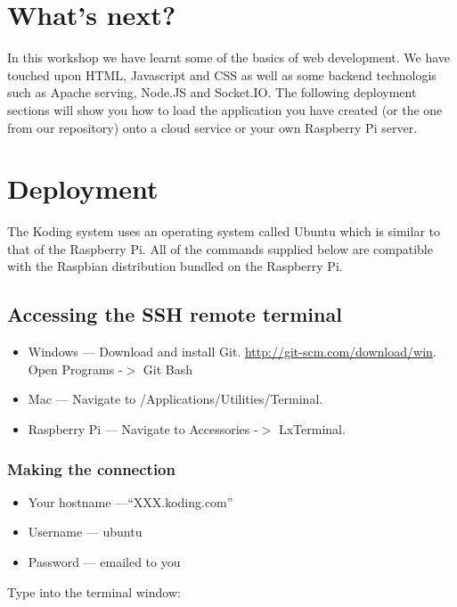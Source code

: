 \documentclass[twocolumn]{article}
\begin{document}
\section{What's next?}

In this workshop we have learnt some of the basics of web development. We have touched upon HTML, Javascript and CSS as well as some backend technologis such as Apache serving, Node.JS and Socket.IO. The following deployment sections will show you how to load the application you have created (or the one from our repository) onto a cloud service or your own Raspberry Pi server.

\section{Deployment}

The Koding system uses an operating system called Ubuntu which is similar to that of the Raspberry Pi. All of the commands supplied below are compatible with the Raspbian distribution bundled on the Raspberry Pi. 

\subsection{Accessing the SSH remote terminal}
\label{sec:terminal}

\begin{itemize}
\item Windows --- Download and install Git. \url{http://git-scm.com/download/win}. Open Programs -$>$ Git Bash
\item Mac --- Navigate to /Applications/Utilities/Terminal.
\item Raspberry Pi --- Navigate to Accessories -$>$ LxTerminal.
\end{itemize}

\subsubsection{Making the connection}
\label{sec:MakingTheConnection}

\begin{itemize}
\item Your hostname ---``XXX.koding.com'' 
\item Username --- ubuntu
\item Password --- emailed to you
\end{itemize}

Type into the terminal window:
\end{document}
